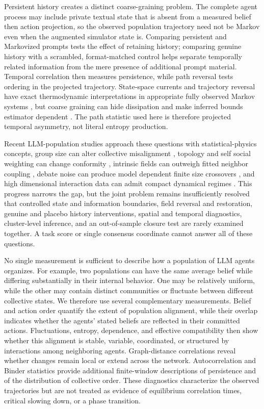 \documentclass[12pt]{article}
\begin{document}
Persistent history creates a distinct coarse-graining problem.  The complete
agent process may include private textual state that is absent from a measured
belief then action projection, so the observed population trajectory need not be
Markov even when the augmented simulator state is.  Comparing persistent and
Markovized prompts tests the effect of retaining history; comparing genuine
history with a scrambled, format-matched control helps separate temporally
related information from the mere presence of additional prompt material.
Temporal correlation then measures persistence, while path reversal tests
ordering in the projected trajectory.  State-space currents and trajectory
reversal have exact thermodynamic interpretations in appropriate fully
observed Markov systems \cite{seifert2012,roldan2012}, but coarse graining can
hide dissipation and make inferred bounds estimator dependent
\cite{kawaguchi2013,busiello2019}.  The path statistic used here is therefore
projected temporal asymmetry, not literal entropy production.

Recent LLM-population studies  approach these questions with
statistical-physics concepts, group size can alter collective misalignment
\cite{flint2025}, topology and self social weighting can change conformity
\cite{han2026}, intrinsic fields can outweigh fitted neighbor coupling
\cite{denobili2026}, debate noise can produce model dependent finite size
crossovers \cite{okawa2026}, and high dimensional interaction data can admit
compact dynamical regimes \cite{el2026}.  This progress narrows the gap, but
the joint problem remains insufficiently resolved that controlled state and
information boundaries, field reversal and restoration, genuine and placebo
history interventions, spatial and temporal diagnostics, cluster-level
inference, and an out-of-sample closure test are rarely examined together.
A task score or single consensus coordinate cannot answer all of these
questions.


No single measurement is sufficient to describe how a population of LLM agents
organizes. For example, two populations can have the same average belief while
differing substantially in their internal behavior. One may be relatively
uniform, while the other may contain distinct communities or fluctuate between
different collective states. We therefore use several complementary
measurements. Belief and action order quantify the extent of population
alignment, while their overlap indicates whether the agents' stated beliefs
are reflected in their committed actions. Fluctuations, entropy, dependence,
and effective compatibility then show whether this alignment is stable,
variable, coordinated, or structured by interactions among neighboring
agents. Graph-distance correlations reveal whether changes remain local or
extend across the network. Autocorrelation and Binder statistics provide
additional finite-window descriptions of persistence and of the distribution
of collective order. These diagnostics characterize the observed trajectories
but are not treated as evidence of equilibrium correlation times, critical
slowing down, or a phase transition.
\end{document}
